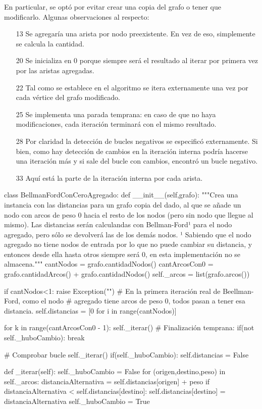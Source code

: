 \documentclass[../tp2_grupo404.tex]{subfiles}
\begin{document}
En particular, se optó por evitar crear una copia del grafo o tener que modificarlo. Algunas observaciones al respecto:
\begin{enumerate}
    \item[13] Se agregaría una arista por nodo preexistente. En vez de eso, simplemente se calcula la cantidad.
    \item[20] Se inicializa en 0 porque siempre será el resultado al iterar por primera vez por las aristas agregadas.
    \item[22] Tal como se establece en el algoritmo se itera externamente una vez por cada vértice del grafo modificado.
    \item[25] Se implementa una parada temprana: en caso de que no haya modificaciones, cada iteración terminará con el mismo resultado.
    \item[28] Por claridad la detección de bucles negativos se especificó externamente.
    Si bien, como hay detección de cambios en la iteración interna podría hacerse una iteración más y si sale del bucle
    con cambios, encontró un bucle negativo.
    \item[33] Aquí está la parte de la iteración interna por cada arista.
\end{enumerate}

\begin{alternate}[breaklines=true,numbers=left,xleftmargin=5mm]
    class BellmanFordConCeroAgregado:
    def __init__(self,grafo):
        """Crea una instancia con las distancias para un grafo copia del
        dado, al que se añade un nodo con arcos de peso 0 hacia el resto
        de los nodos (pero sin nodo que llegue al mismo). Las distancias
        serán calculandas con Bellman-Ford¹ para el nodo agregado, pero
        sólo se devolverá las de los demás nodos.
        ¹ Sabiendo que el nodo agregado no tiene nodos de entrada por lo
        que no puede cambiar su distancia, y entonces desde ella hasta
        otros siempre será 0, en esta implementación no se almacena."""
        cantNodos = grafo.cantidadNodos()
        cantArcosCon0 = grafo.cantidadArcos() + grafo.cantidadNodos()
        self._arcos = list(grafo.arcos())

        if cantNodos<1:
            raise Exception("")
        # En la primera iteración real de Beellman-Ford, como el nodo
        # agregado tiene arcos de peso 0, todos pasan a tener esa distancia.
        self.distancias = [0 for i in range(cantNodos)]

        for k in range(cantArcosCon0 - 1):
            self._iterar()
            # Finalización temprana:
            if(not self._huboCambio):
                break

        # Comprobar bucle
        self._iterar()
        if(self._huboCambio):
            self.distancias = False

    def _iterar(self):
        self._huboCambio = False
        for (origen,destino,peso) in self._arcos:
            distanciaAlternativa = self.distancias[origen] + peso
            if distanciaAlternativa < self.distancias[destino]:
                self.distancias[destino] = distanciaAlternativa
                self._huboCambio = True
\end{alternate}
\end{document}
